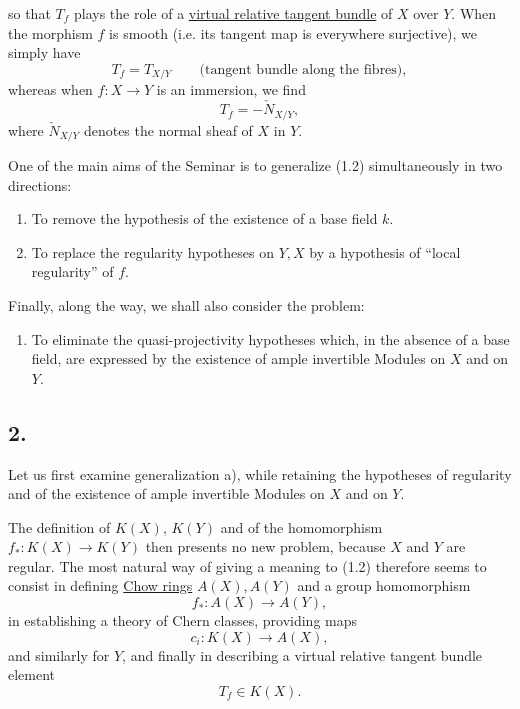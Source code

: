 so that $T_f$ plays the role of a \underline{virtual relative tangent bundle} of $X$ over $Y$. When the morphism $f$ is smooth (i.e. its tangent map is everywhere surjective), we simply have
\[
T_f=T_{X/Y}\qquad\text{(tangent bundle along the fibres)},
\]
whereas when $f:X\to Y$ is an immersion, we find
\[
T_f=-\check N_{X/Y},
\]
where $\check N_{X/Y}$ denotes the normal sheaf of $X$ in $Y$.

One of the main aims of the Seminar is to generalize (1.2) simultaneously in two directions:
\begin{enumerate}[label=\alph*)]
\item To remove the hypothesis of the existence of a base field $k$.
\item To replace the regularity hypotheses on $Y,X$ by a hypothesis of ``local regularity'' of $f$.
\end{enumerate}
Finally, along the way, we shall also consider the problem:
\begin{enumerate}[label=\alph*),start=3]
\item To eliminate the quasi-projectivity hypotheses which, in the absence of a base field, are expressed by the existence of ample invertible Modules on $X$ and on $Y$.
\end{enumerate}

\subsection*{2.}
Let us first examine generalization a), while retaining the hypotheses of regularity and of the existence of ample invertible Modules on $X$ and on $Y$.

The definition of $K(X)$, $K(Y)$ and of the homomorphism $f_*:K(X)\to K(Y)$ then presents no new problem, because $X$ and $Y$ are regular. The most natural way of giving a meaning to (1.2) therefore seems to consist in defining \underline{Chow rings} $A(X),A(Y)$ and a group homomorphism
\[
f_*:A(X)\longrightarrow A(Y),
\]
in establishing a theory of Chern classes, providing maps
\[
c_i:K(X)\longrightarrow A(X),
\]
and similarly for $Y$, and finally in describing a virtual relative tangent bundle element
\[
T_f\in K(X).
\]

